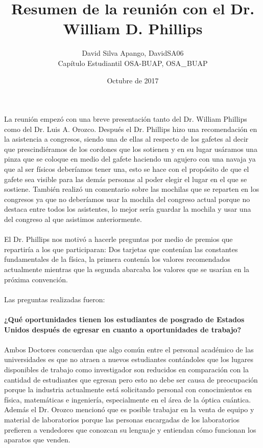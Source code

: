 \documentclass[10pt,letterpaper]{article}
\title{Resumen de la reunión con el Dr. William D. Phillips}
\date{Octubre de 2017}
\author{David Silva Apango, \faTwitter DavidSA06\\ Capítulo Estudiantil OSA-BUAP, \faTwitter OSA$\char`_$BUAP}
\begin{document}
\maketitle
La reunión empezó con una breve presentación tanto del Dr. William Phillips como del Dr. Luis A. Orozco. Después el Dr. Phillips hizo una recomendación en la asistencia a congresos, siendo una de ellas al respecto de los gafetes al decir que prescindiéramos de los cordones que los sotienen y en su lugar usáramos una pinza que se coloque en medio del gafete haciendo un agujero con una navaja ya que al ser físicos deberíamos tener una, esto se hace con el propósito de que el gafete sea visible para las demás personas al poder elegir el lugar en el que se sostiene. También realizó un comentario sobre las mochilas que se reparten en los congresos ya que no deberíamos usar la mochila del congreso actual porque no destaca entre todos los asistentes, lo mejor sería guardar la mochila y usar una del congreso al que asistimos anteriormente.
\\
\\
El Dr. Phillips nos motivó a hacerle preguntas por medio de premios que repartiría a los que participaran: Dos tarjetas que contenían las constantes fundamentales de la física, la primera contenía los valores recomendados actualmente mientras que la segunda abarcaba los valores que se usarían en la próxima convención.
\\
\\
Las preguntas realizadas fueron:
\\
\\
\textbf{¿Qué oportunidades tienen los estudiantes de posgrado de Estados Unidos después de egresar en cuanto a oportunidades de trabajo?}
\\
\\
Ambos Doctores concuerdan que algo común entre el personal académico de las universidades es que no atraen a nuevos estudiantes contándoles que los lugares disponibles de trabajo como investigador son reducidos en comparación con la cantidad de estudiantes que egresan pero esto no debe ser causa de preocupación porque la industria actualmente está solicitando personal con conocimientos en física, matemáticas e ingeniería, especialmente en el área de la óptica cuántica. Además el Dr. Orozco mencionó que es posible trabajar en la venta de equipo y material de laboratorios porque las personas encargadas de los laboratorios prefieren a vendedores que conozcan su lenguaje y entiendan cómo funcionan los aparatos que venden.
\\
\end{document}
